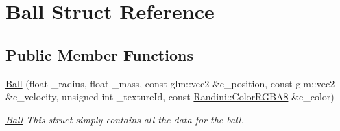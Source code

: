 \hypertarget{structBall}{
\section{Ball Struct Reference}
\label{structBall}
}
\subsection*{Public Member Functions}
\begin{DoxyCompactItemize}
\item 
\hyperlink{structBall_a39a1cb33a6f2e3a4c692144967c3f4ef}{Ball} (float \_\-radius, float \_\-mass, const glm::vec2 \&c\_\-position, const glm::vec2 \&c\_\-velocity, unsigned int \_\-textureId, const \hyperlink{structRandini_1_1ColorRGBA8}{Randini::ColorRGBA8} \&c\_\-color)
\begin{DoxyCompactList}\small\item\em \hyperlink{structBall}{Ball} This struct simply contains all the data for the ball. \item\end{DoxyCompactList}\end{DoxyCompactItemize}
